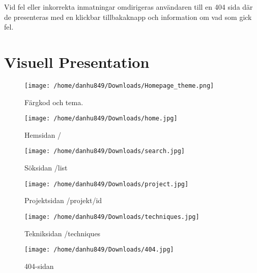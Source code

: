 \documentclass{TDP003mall}
\begin{document}
Vid fel eller inkorrekta inmatningar omdirigeras användaren till en 404 sida där de presenteras med en klickbar tillbakaknapp och information om vad som gick fel.

\newpage

\section{Visuell Presentation}
\begin{figure}[h]
  \centerline{\texttt{[image: /home/danhu849/Downloads/Homepage\_theme.png]}}
  \caption{Färgkod och tema.}
  \label{fig}
\end{figure}

\begin{figure}[h]
  \centerline{\texttt{[image: /home/danhu849/Downloads/home.jpg]}}
  \caption{Hemsidan /}
  \label{fig}
\end{figure}

\begin{figure}[h]
  \centerline{\texttt{[image: /home/danhu849/Downloads/search.jpg]}}
  \caption{Söksidan /list}
  \label{fig}
\end{figure}

\begin{figure}[h]
  \centerline{\texttt{[image: /home/danhu849/Downloads/project.jpg]}}
  \caption{Projektsidan /projekt/id}
  \label{fig}
\end{figure}

\begin{figure}[h]
  \centerline{\texttt{[image: /home/danhu849/Downloads/techniques.jpg]}}
  \caption{Tekniksidan /techniques}
  \label{fig}
\end{figure}

\begin{figure}[h]
  \centerline{\texttt{[image: /home/danhu849/Downloads/404.jpg]}}
  \caption{404-sidan}
  \label{fig}
\end{figure}
\end{document}
